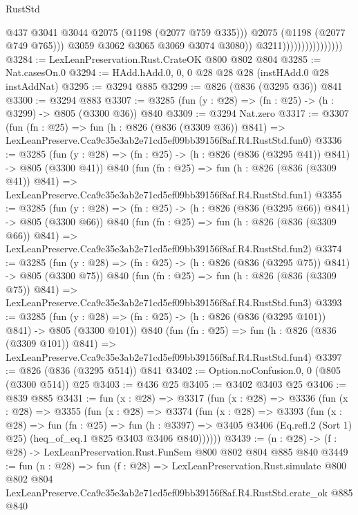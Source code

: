 \begin{lexlean}{RustStd}
\begin{coremodule}
                                            @437
                                            @3041
                                            @3044
                                            @2075
                                            (@1198 (@2077 @759 @335)))
                                          @2075
                                          (@1198 (@2077 @749 @765)))
                                        @3059
                                        @3062
                                        @3065
                                        @3069
                                        @3074
                                        @3080))
                                    @3211))))))))))))))))
@3284 := LexLeanPreservation.Rust.CrateOK @800 @802 @804
@3285 := Nat.casesOn.{0}
@3294 := HAdd.hAdd.{0, 0, 0} @28 @28 @28 (instHAdd.{0} @28 instAddNat)
@3295 := @3294 @885
@3299 := @826 (@836 (@3295 @36)) @841
@3300 := @3294 @883
@3307 := @3285 (fun (y : @28) => (fn : @25) -> (h : @3299) -> @805 (@3300 @36)) @840
@3309 := @3294 Nat.zero
@3317 := @3307
    (fun (fn : @25) =>
    fun (h : @826 (@836 (@3309 @36)) @841) =>
    LexLeanPreserve.Cca9c35e3ab2e71cd5ef09bb39156f8af.R4.RustStd.fun0)
@3336 := @3285
    (fun (y : @28) => (fn : @25) -> (h : @826 (@836 (@3295 @41)) @841) -> @805 (@3300 @41))
    @840
    (fun (fn : @25) =>
    fun (h : @826 (@836 (@3309 @41)) @841) =>
    LexLeanPreserve.Cca9c35e3ab2e71cd5ef09bb39156f8af.R4.RustStd.fun1)
@3355 := @3285
    (fun (y : @28) => (fn : @25) -> (h : @826 (@836 (@3295 @66)) @841) -> @805 (@3300 @66))
    @840
    (fun (fn : @25) =>
    fun (h : @826 (@836 (@3309 @66)) @841) =>
    LexLeanPreserve.Cca9c35e3ab2e71cd5ef09bb39156f8af.R4.RustStd.fun2)
@3374 := @3285
    (fun (y : @28) => (fn : @25) -> (h : @826 (@836 (@3295 @75)) @841) -> @805 (@3300 @75))
    @840
    (fun (fn : @25) =>
    fun (h : @826 (@836 (@3309 @75)) @841) =>
    LexLeanPreserve.Cca9c35e3ab2e71cd5ef09bb39156f8af.R4.RustStd.fun3)
@3393 := @3285
    (fun (y : @28) => (fn : @25) -> (h : @826 (@836 (@3295 @101)) @841) -> @805 (@3300 @101))
    @840
    (fun (fn : @25) =>
    fun (h : @826 (@836 (@3309 @101)) @841) =>
    LexLeanPreserve.Cca9c35e3ab2e71cd5ef09bb39156f8af.R4.RustStd.fun4)
@3397 := @826 (@836 (@3295 @514)) @841
@3402 := Option.noConfusion.{0, 0} (@805 (@3300 @514)) @25
@3403 := @436 @25
@3405 := @3402 @3403 @25
@3406 := @839 @885
@3431 := fun (x : @28) =>
  @3317
    (fun (x : @28) =>
    @3336
      (fun (x : @28) =>
      @3355
        (fun (x : @28) =>
        @3374
          (fun (x : @28) =>
          @3393
            (fun (x : @28) =>
            fun (fn : @25) =>
            fun (h : @3397) =>
            @3405 @3406 (Eq.refl.{2} (Sort 1) @25) (heq_of_eq.{1} @825 @3403 @3406 @840))))))
@3439 := (n : @28) -> (f : @28) -> LexLeanPreservation.Rust.FunSem @800 @802 @804 @885 @840
@3449 := fun (n : @28) =>
  fun (f : @28) =>
  LexLeanPreservation.Rust.simulate
    @800
    @802
    @804
    LexLeanPreserve.Cca9c35e3ab2e71cd5ef09bb39156f8af.R4.RustStd.crate_ok
    @885
    @840
\end{coremodule}
\end{lexlean}
